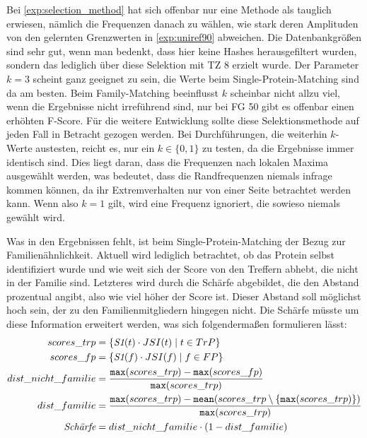     Bei \autoref{exp:selection_method} hat sich offenbar nur eine Methode als tauglich erwiesen, nämlich die Frequenzen danach zu wählen, wie stark deren Amplituden von den gelernten Grenzwerten in \autoref{exp:uniref90} abweichen. Die Datenbankgrößen sind sehr gut, wenn man bedenkt, dass hier keine Hashes herausgefiltert wurden, sondern das lediglich über diese Selektion mit \ac{TZ} 8 erzielt wurde. Der Parameter $k=3$ scheint ganz geeignet zu sein, die Werte beim Single-Protein-Matching sind da am besten. Beim Family-Matching beeinflusst $k$ scheinbar nicht allzu viel, wenn die Ergebnisse nicht irreführend sind, nur bei \ac{FG} 50 gibt es offenbar einen erhöhten F-Score. Für die weitere Entwicklung sollte diese Selektionsmethode auf jeden Fall in Betracht gezogen werden. Bei Durchführungen, die weiterhin $k$-Werte austesten, reicht es, nur ein $k \in \{0, 1\}$ zu testen, da die Ergebnisse immer identisch sind. Dies liegt daran, dass die Frequenzen nach lokalen Maxima ausgewählt werden, was bedeutet, dass die Randfrequenzen niemals infrage kommen können, da ihr Extremverhalten nur von einer Seite betrachtet werden kann. Wenn also $k=1$ gilt, wird eine Frequenz ignoriert, die sowieso niemals gewählt wird.

    Was in den Ergebnissen fehlt, ist beim Single-Protein-Matching der Bezug zur Familienähnlichkeit. Aktuell wird lediglich betrachtet, ob das Protein selbst identifiziert wurde und wie weit sich der Score von den Treffern abhebt, die nicht in der Familie sind. Letzteres wird durch die Schärfe abgebildet, die den Abstand prozentual angibt, also wie viel höher der Score ist. Dieser Abstand soll möglichst hoch sein, der zu den Familienmitgliedern hingegen nicht. Die Schärfe müsste um diese Information erweitert werden, was sich folgendermaßen formulieren lässt:
    \begin{equation}
        \label{equ:}
        \begin{split}
            scores\_trp &= \{\emph{S1}(t) \cdot JSI(t) \mid t \in TrP\}\\
            scores\_fp &= \{\emph{S1}(f) \cdot JSI(f) \mid f \in FP\}\\
            dist\_nicht\_familie &= \frac{\texttt{max}(scores\_trp) - \texttt{max}(scores\_fp)}{\texttt{max}(scores\_trp)}\\
            dist\_familie &= \frac{\texttt{max}(scores\_trp) - \texttt{mean}(scores\_trp \setminus \{\texttt{max}(scores\_trp)\})}{\texttt{max}(scores\_trp)}\\
            \emph{Schärfe} &= dist\_nicht\_familie \cdot (1 - dist\_familie)
        \end{split}
    \end{equation}

